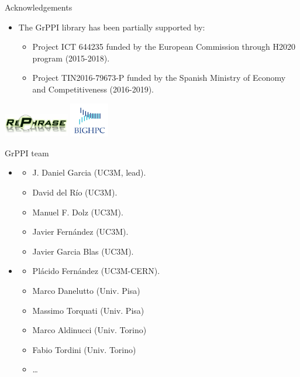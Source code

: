 \begin{frame}[t]{Acknowledgements}
\begin{itemize}
  \item The GrPPI library has been partially supported by:
    \begin{itemize}
      \vfill
      \item Project ICT 644235  
            funded by the European Commission through H2020 program (2015-2018).
      \vfill
      \item Project TIN2016-79673-P  
            funded by the Spanish Ministry of Economy and Competitiveness (2016-2019).
    \end{itemize}
\end{itemize}

\vfill
\begin{center}
\includegraphics[height=1cm]{logos/rephrase.jpg}
\hspace{1cm}
\includegraphics[height=1.5cm]{logos/bighpc.png}
\end{center}
\end{frame}

\begin{frame}[t]{GrPPI team}
\begin{itemize}
  \item {}
  \begin{itemize}
    \item J. Daniel Garcia (UC3M, lead).
    \item David del Río (UC3M).
    \item Manuel F. Dolz (UC3M).
    \item Javier Fernández (UC3M).
    \item Javier Garcia Blas (UC3M).
  \end{itemize}
  \vfill
  \item {}
  \begin{itemize}
    \item Plácido Fernández (UC3M-CERN).
    \item Marco Danelutto (Univ. Pisa)
    \item Massimo Torquati (Univ. Pisa)
    \item Marco Aldinucci (Univ. Torino)
    \item Fabio Tordini (Univ. Torino)
    \item \ldots
  \end{itemize}
\end{itemize}
\end{frame}
